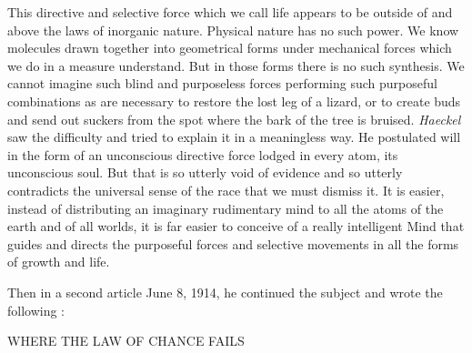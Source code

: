 This directive and selective force which we call life appears to be outside of and above the
laws of inorganic nature. Physical nature has no such power. We know molecules drawn
together into geometrical forms under mechanical forces which we do in a measure
understand. But in those forms there is no such synthesis. We cannot imagine such blind and
purposeless forces performing such purposeful combinations as are necessary to restore the
lost leg of a lizard, or to create buds and send out suckers from the spot where the bark of the
tree is bruised. \textit{Haeckel} saw the difficulty and tried to explain it in a meaningless way. He
postulated will in the form of an unconscious directive force lodged in every atom, its
unconscious soul. But that is so utterly void of evidence and so utterly contradicts the
universal sense of the race that we must dismiss it. It is easier, instead of distributing an
imaginary rudimentary mind to all the atoms of the earth and of all worlds, it is far easier to
conceive of a really intelligent Mind that guides and directs the purposeful forces and
selective movements in all the forms of growth and life.

Then in a second article June 8, 1914, he continued the subject and wrote the following :

WHERE THE LAW OF CHANCE FAILS

